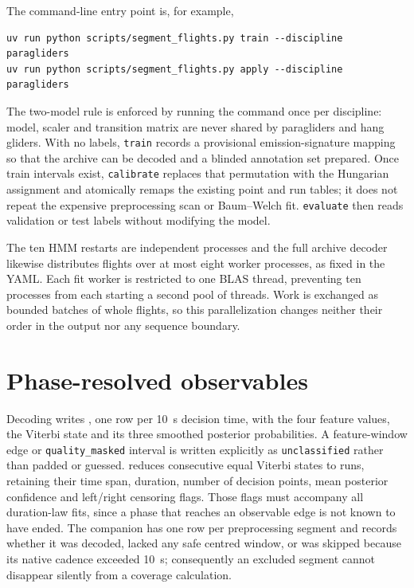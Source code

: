 The command-line entry point is, for example,
\begin{verbatim}
uv run python scripts/segment_flights.py train --discipline paragliders
uv run python scripts/segment_flights.py apply --discipline paragliders
\end{verbatim}
The two-model rule is enforced by running the command once per discipline: model, scaler
and transition matrix are never shared by paragliders and hang gliders.  With no labels,
\texttt{train} records a provisional emission-signature mapping so that the archive can
be decoded and a blinded annotation set prepared.  Once train intervals exist,
\texttt{calibrate} replaces that permutation with the Hungarian assignment and atomically
remaps the existing point and run tables; it does not repeat the expensive preprocessing
scan or Baum--Welch fit.  \texttt{evaluate} then reads validation or test labels without
modifying the model.

The ten HMM restarts are independent processes and the full archive decoder likewise
distributes flights over at most eight worker processes, as fixed in the YAML.  Each fit
worker is restricted to one BLAS thread, preventing ten processes from each starting a
second pool of threads.  Work is exchanged as bounded batches of whole flights, so this
parallelization changes neither their order in the output nor any sequence boundary.

\section{Phase-resolved observables}
\label{impl:phaseobs}
Decoding writes , one row per \SI{10}{\second} decision time,
with the four feature values, the Viterbi state and its three smoothed posterior
probabilities. A feature-window edge or \texttt{quality\_masked} interval is written
explicitly as \texttt{unclassified} rather than padded or guessed.
 reduces consecutive equal Viterbi
states to runs, retaining their time span, duration, number of decision points, mean
posterior confidence and left/right censoring flags. Those flags must accompany all
duration-law fits, since a phase that reaches an observable edge is not known to have ended.
The companion  has one row per preprocessing segment and
records whether it was decoded, lacked any safe centred window, or was skipped because its
native cadence exceeded \SI{10}{\second}; consequently an excluded segment cannot disappear
silently from a coverage calculation.

